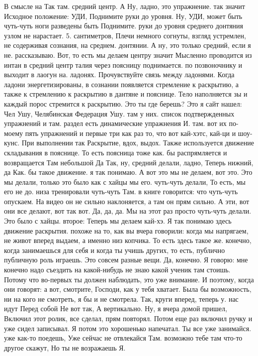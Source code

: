 В смысле на Так там.
средний центр. А Ну, ладно, это упражнение. так значит Исходное положение: УДИ, Поднимите руки до уровня. Ну, УДИ, может быть чуть-чуть ноги разведены быть Поднимите.
руки до уровня среднего донтяния узлом не нарастает. 5.
сантиметров, Плечи немного согнуты, взгляд устремлен, не содерживая сознания, на среднем.
донтянии. А ну, это только средний, если я не.
рассказываю. Вот, то есть мы делаем центру значит Мысленно проводится из интан в средний центр талия через поясницу поднимается.
по позвоночнику и выходит в лаогун на.
ладонях. Прочувствуйте связь между ладонями. Когда ладони энергетизированы, в сознании появляется стремление к раскрытию, а также к стремлению к раскрытию в дантяне и пояснице.
Тело наполняется зы и каждый порос стремится к раскрытию. Это ты где берешь?
Это я сайт нашел: Чел Ушу, Челябинская Федерация Ушу.
там у них.
список подтвержденных упражнений и там.
раздел есть динамические упражнения И.
там. вот их по-моему пять упражнений и первые три как раз то, что вот кай-хэтс, кай-ци и шоу-кунс. При выполнении так Раскрытие, вдох, выдох. Также используется движение складывания в пояснице.
То есть поясница тоже как.
бы распрямляется и возвращается Там небольшой Да Так, ну, средний делали, ладно, Теперь нижний, да Как.
бы такое движение. я так понимаю. А вот это мы не делаем, вот это.
Это мы делали, только это было как с хайцы мы его.
чуть-чуть делали, То есть, мы его не до.
низа тренировали чуть-чуть Там.
в книге говорится:
что чуть-чуть опускаем.
На видео он не сильно наклоняется, а там он прям сильно.
А эти, вот они все делают, вот так вот.
Да, да, да.
Мы на этот раз просто чуть-чуть делали.
Это было с хайцы. второе:
Теперь мы делаем кай-хэ.
Я так понимаю здесь движение раскрытия. похоже на то, как вы вчера говорили: когда мы напрягаем, не живот вперед выдаем, а именно низ копчика.
То есть здесь такое же.
конечно, когда занимаешься для себя и когда ты учишь других, то есть, публично публичную роль играешь.
Это совсем разные вещи.
Да, конечно.
Я говорю: мне конечно надо съездить на какой-нибудь не знаю какой ученик там стоишь.
Потому что во-первых ты должен наблюдать, это уже внимание.
И поэтому, когда они говорят: а вот,
смотрите, Господи, как у тебя хватает. Была бы возможность, ни на кого не смотреть, я бы и не смотрела. Так, круги вперед, теперь у.
нас идут Перед собой Не вот так, А вертикально. Ну, я вчера домой пришел, Включил этот ролик, все сделал, прям повторял. Потом еще раз включил ручку и уже сидел записывал. Я потом это хорошенько напечатал.
Ты все уже занимайся.
уже как-то поедешь, Уже сейчас не отвлекайся Там. возможно тебе там что-то другое скажут, Но ты не возражаешь Я.
